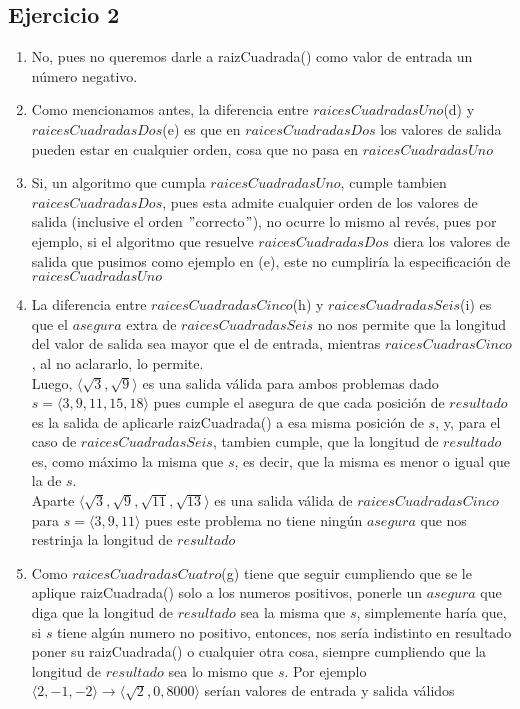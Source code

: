 	\subsection{Ejercicio 2}
	\begin{enumerate}
	\item No, pues no queremos darle a raizCuadrada() como valor de entrada un número negativo.
	\item Como mencionamos antes, la diferencia entre $raicesCuadradasUno$(d) y $raicesCuadradasDos$(e) es que en $raicesCuadradasDos$ los valores de salida pueden estar en cualquier orden, cosa que no pasa en $raicesCuadradasUno$
	\item Si, un algoritmo que cumpla $raicesCuadradasUno$, cumple tambien $raicesCuadradasDos$, pues esta admite cualquier orden de los valores de salida (inclusive el orden $"$correcto$"$), no ocurre lo mismo al revés, pues por ejemplo, si el algoritmo que resuelve $raicesCuadradasDos$ diera los valores de salida que pusimos como ejemplo en (e), este no cumpliría la especificación de $raicesCuadradasUno$
	\item La diferencia entre $raicesCuadradasCinco$(h) y $raicesCuadradasSeis$(i) es que el $asegura$ extra de $raicesCuadradasSeis$ no nos permite que la longitud del valor de salida sea mayor que el de entrada, mientras $raicesCuadrasCinco$, al no aclararlo, lo permite.\\
	Luego, $\langle \sqrt{3},\sqrt{9} \rangle$ es una salida válida para ambos problemas dado $s=\langle 3,9,11,15,18 \rangle$ pues cumple el asegura de que cada posición de $resultado$ es la salida de aplicarle raizCuadrada() a esa misma posición de $s$, y, para el caso de $raicesCuadradasSeis$, tambien cumple, que la longitud de $resultado$ es, como máximo la misma que $s$, es decir, que la misma es menor o igual que la de $s$.\\
	Aparte $\langle \sqrt{3},\sqrt{9},\sqrt{11},\sqrt{13} \rangle$ es una salida válida de $raicesCuadradasCinco$ para $s=\langle 3,9,11 \rangle$ pues este problema no tiene ningún $asegura$ que nos restrinja la longitud de $resultado$
	\item Como $raicesCuadradasCuatro$(g) tiene que seguir cumpliendo que se le aplique raizCuadrada() solo a los numeros positivos, ponerle un $asegura$ que diga que la longitud de $resultado$ sea la misma que $s$, simplemente haría que, si $s$ tiene algún numero no positivo, entonces, nos sería indistinto en resultado poner su raizCuadrada() o cualquier otra cosa, siempre cumpliendo que la longitud de $resultado$ sea lo mismo que $s$. Por ejemplo $\langle 2,-1,-2 \rangle \rightarrow \langle \sqrt{2},0,8000 \rangle$ serían valores de entrada y salida válidos

\end{enumerate}
